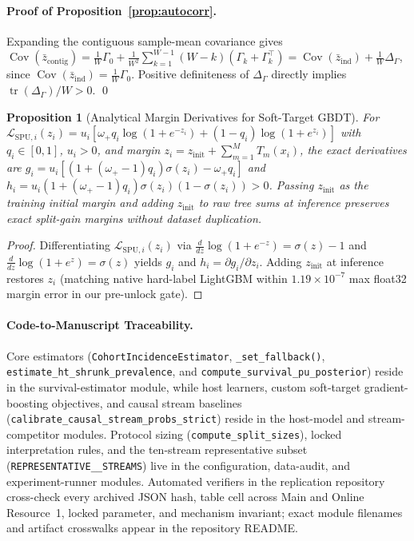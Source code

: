 \documentclass[pdflatex,sn-basic]{sn-jnl}
\theoremstyle{definition}
\theoremstyle{plain}
\newtheorem{proposition}{Proposition}
\begin{document}
\begin{appendices}
\paragraph{Proof of Proposition~\ref{prop:autocorr}.}
Expanding the contiguous sample-mean covariance gives $\operatorname{Cov}(\bar{z}_{\text{contig}}) = \frac{1}{W}\Gamma_0 + \frac{1}{W^2}\sum_{k=1}^{W-1}(W-k)(\Gamma_k + \Gamma_k^\top) = \operatorname{Cov}(\bar{z}_{\text{ind}}) + \frac{1}{W}\Delta_\Gamma$, since $\operatorname{Cov}(\bar{z}_{\text{ind}}) = \frac{1}{W}\Gamma_0$. Positive definiteness of $\Delta_\Gamma$ directly implies $\operatorname{tr}(\Delta_\Gamma)/W > 0$. \qed

\begin{proposition}[Analytical Margin Derivatives for Soft-Target GBDT]
\label{prop:lgbm}
For $\mathcal{L}_{\text{SPU},i}(z_i) = u_i[\omega_+ q_i \log(1 + e^{-z_i}) + (1 - q_i)\log(1 + e^{z_i})]$ with $q_i \in [0, 1]$, $u_i > 0$, and margin $z_i = z_{\text{init}} + \sum_{m=1}^M T_m(x_i)$, the exact derivatives are $g_i = u_i[(1 + (\omega_+ - 1)q_i)\sigma(z_i) - \omega_+ q_i]$ and $h_i = u_i(1 + (\omega_+ - 1)q_i)\sigma(z_i)(1 - \sigma(z_i)) > 0$. Passing $z_{\text{init}}$ as the training initial margin and adding $z_{\text{init}}$ to raw tree sums at inference preserves exact split-gain margins without dataset duplication.
\end{proposition}

\begin{proof}
Differentiating $\mathcal{L}_{\text{SPU},i}(z_i)$ via $\frac{d}{dz}\log(1+e^{-z}) = \sigma(z)-1$ and $\frac{d}{dz}\log(1+e^z) = \sigma(z)$ yields $g_i$ and $h_i = \partial g_i/\partial z_i$. Adding $z_{\text{init}}$ at inference restores $z_i$ (matching native hard-label LightGBM within $1.19 \times 10^{-7}$ max float32 margin error in our pre-unlock gate).
\end{proof}

\paragraph{Code-to-Manuscript Traceability.}
\begingroup\raggedright
Core estimators (\texttt{Cohort\allowbreak Incidence\allowbreak Estimator}, \texttt{\_set\_fallback()}, \texttt{estimate\_\allowbreak ht\_\allowbreak shrunk\_\allowbreak prevalence}, and \texttt{compute\_\allowbreak survival\_\allowbreak pu\_\allowbreak posterior}) reside in the survival-estimator module, while host learners, custom soft-target gradient-boosting objectives, and causal stream baselines (\texttt{calibrate\_\allowbreak causal\_\allowbreak stream\_\allowbreak probs\_\allowbreak strict}) reside in the host-model and stream-competitor modules. Protocol sizing (\texttt{compute\_\allowbreak split\_\allowbreak sizes}), locked interpretation rules, and the ten-stream representative subset (\texttt{REPRESENTATIVE\_\_\allowbreak STREAMS}) live in the configuration, data-audit, and experiment-runner modules. Automated verifiers in the replication repository cross-check every archived JSON hash, table cell across Main and Online Resource~1, locked parameter, and mechanism invariant; exact module filenames and artifact crosswalks appear in the repository README.
\endgroup

\end{appendices}

\begingroup\raggedright

\endgroup
\end{document}

